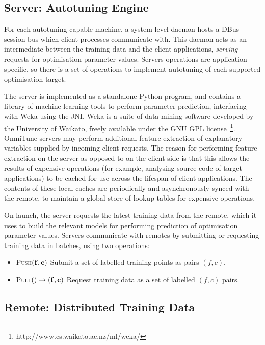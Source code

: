 \subsection{Server: Autotuning Engine}

For each autotuning-capable machine, a system-level daemon hosts a
DBus session bus which client processes communicate with. This daemon
acts as an intermediate between the training data and the client
applications, \emph{serving} requests for optimisation parameter
values. Servers operations are application-specific, so there is a set
of operations to implement autotuning of each supported optimisation
target.

The server is implemented as a standalone Python program, and contains
a library of machine learning tools to perform parameter prediction,
interfacing with Weka using the JNI. Weka is a suite of data mining
software developed by the University of Waikato, freely available
under the GNU GPL
license~\footnote{http://www.cs.waikato.ac.nz/ml/weka/}. OmniTune
servers may perform additional feature extraction of explanatory
variables supplied by incoming client requests. The reason for
performing feature extraction on the server as opposed to on the
client side is that this allows the results of expensive operations
(for example, analysing source code of target applications) to be
cached for use across the lifespan of client applications. The
contents of these local caches are periodically and asynchronously
synced with the remote, to maintain a global store of lookup tables
for expensive operations.

On launch, the server requests the latest training data from the
remote, which it uses to build the relevant models for performing
prediction of optimisation parameter values. Servers communicate with
remotes by submitting or requesting training data in batches, using
two operations:
%
\begin{itemize}
\item \textsc{Push}$(\bf{f}, \bf{c})$ Submit a set of labelled training
  points as pairs $(f,c)$.
\item \textsc{Pull}$() \to (\bf{f}, \bf{c})$ Request training data as a
  set of labelled $(f,c)$ pairs.
\end{itemize}


\subsection{Remote: Distributed Training Data}

